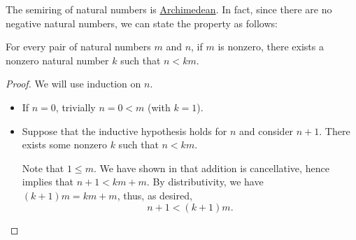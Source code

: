 \begin{proposition}\label{thm:natural_numbers_archimedean}
  The semiring of natural numbers is \hyperref[def:archimedean_semiring]{Archimedean}. In fact, since there are no negative natural numbers, we can state the property as follows:
  \begin{displayquote}
    For every pair of natural numbers \( m \) and \( n \), if \( m \) is nonzero, there exists a nonzero natural number \( k \) such that \( n < km \).
  \end{displayquote}
\end{proposition}
\begin{proof}
  We will use induction on \( n \).

  \begin{itemize}
    \item If \( n = 0 \), trivially \( n = 0 < m \) (with \( k = 1 \)).

    \item Suppose that the inductive hypothesis holds for \( n \) and consider \( n + 1 \). There exists some nonzero \( k \) such that \( n < km \).

    Note that \( 1 \leq m \). We have shown in  that addition is cancellative, hence  implies that \( n + 1 < km + m \). By distributivity, we have \( (k + 1)m = km + m \), thus, as desired,
    \begin{equation*}
      n + 1 < (k + 1)m.
    \end{equation*}
  \end{itemize}
\end{proof}

